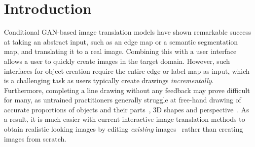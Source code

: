 \section{Introduction}
%
Conditional GAN-based image translation \cite{isola2016image2image,sangkloy2017scribbler,zhu2017unpaired} models have shown remarkable success at taking an abstract input, such as an edge map or a semantic segmentation map, and translating it to a real image. Combining this with a user interface allows a user to quickly create images in the target domain. 
However, such interfaces for object creation require the entire edge or label map as input, which is a challenging task as users typically create drawings \emph{incrementally}.
Furthermore, completing a line drawing without any feedback may prove difficult for many, as untrained practitioners generally struggle at free-hand drawing of accurate proportions of objects and their parts~\cite{cohen1997can}, 3D shapes and perspective~\cite{schmidt2009expert}. 
As a result, it is much easier with current interactive image translation methods to obtain realistic looking images by editing \emph{existing} images~\cite{dekel2018sparse,portenier2018faceshop} rather than creating images from scratch. 

